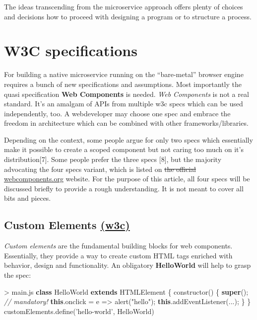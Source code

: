 \documentclass[]{assets/latex/ieee}
\newenvironment{Shaded}{}{}
\newcommand{\KeywordTok}[1]{\textcolor[rgb]{0.00,0.44,0.13}{\textbf{{#1}}}}
\newcommand{\StringTok}[1]{\textcolor[rgb]{0.25,0.44,0.63}{{#1}}}
\newcommand{\CommentTok}[1]{\textcolor[rgb]{0.38,0.63,0.69}{\textit{{#1}}}}
\newcommand{\VariableTok}[1]{\textcolor[rgb]{0.10,0.09,0.49}{{#1}}}
\newcommand{\OperatorTok}[1]{\textcolor[rgb]{0.40,0.40,0.40}{{#1}}}
\newcommand{\AttributeTok}[1]{\textcolor[rgb]{0.49,0.56,0.16}{{#1}}}
\newcommand{\NormalTok}[1]{{#1}}
\begin{document}
The ideas transcending from the microservice approach offers plenty of
choices and decisions how to proceed with designing a program or to
structure a process.

\section{W3C specifications}\label{w3c-specifications}

For building a native microservice running on the ``bare-metal'' browser
engine requires a bunch of new specifications and assumptions. Most
importantly the quasi specification \textbf{Web Components} is needed.
\emph{Web Components} is not a real standard. It's an amalgam of APIs
from multiple w3c specs which can be used independently, too. A
webdeveloper may choose one spec and embrace the freedom in architecture
which can be combined with other frameworks/libraries.

Depending on the context, some people argue for only two specs which
essentially make it possible to create a scoped component but not caring
too much on it's distribution{[}7{]}. Some people prefer the three specs
{[}8{]}, but the majority advocating the four specs variant, which is
listed on \sout{the official}
\href{http://webcomponents.org}{webcomponents.org} website. For the
purpose of this article, all four specs will be discussed briefly to
provide a rough understanding. It is not meant to cover all bits and
pieces.

\subsection{\texorpdfstring{Custom Elements
\href{http://w3c.github.io/webcomponents/spec/custom/}{(w3c)}}{Custom Elements (w3c)}}\label{custom-elements-w3c}

\emph{Custom elements} are the fundamental building blocks for web
components. Essentially, they provide a way to create custom HTML tags
enriched with behavior, design and functionality. An obligatory
\textbf{HelloWorld} will help to grasp the spec:

\begin{Shaded}
\begin{Highlighting}[]
\OperatorTok{>} \VariableTok{main}\NormalTok{.}\AttributeTok{js}
\KeywordTok{class} \NormalTok{HelloWorld }\KeywordTok{extends} \NormalTok{HTMLElement }\OperatorTok{\{}
  \AttributeTok{constructor}\NormalTok{() }\OperatorTok{\{}
    \KeywordTok{super}\NormalTok{()}\OperatorTok{;} \CommentTok{// mandatory!}
    \KeywordTok{this}\NormalTok{.}\AttributeTok{onclick} \OperatorTok{=} \NormalTok{e }\OperatorTok{=>} \AttributeTok{alert}\NormalTok{(}\StringTok{"hello"}\NormalTok{)}\OperatorTok{;}
    \KeywordTok{this}\NormalTok{.}\AttributeTok{addEventListener}\NormalTok{(...)}\OperatorTok{;}
  \OperatorTok{\}}
\OperatorTok{\}}
\VariableTok{customElements}\NormalTok{.}\AttributeTok{define}\NormalTok{(}\StringTok{'hello-world'}\OperatorTok{,} \NormalTok{HelloWorld)}
\end{Highlighting}
\end{Shaded}
\end{document}
